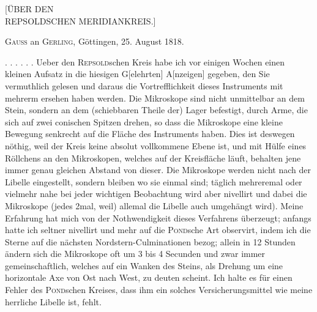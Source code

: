 \clearpage\begingroup
{}\NoSourceHead\HistoricalFoot{}{40\textsuperscript{*}}
\begin{center}
{\large [ÜBER DEN\\REPSOLDSCHEN MERIDIANKREIS.]}\par\medskip
{}\par\medskip
\textsc{Gauss} an \textsc{Gerling}, Göttingen, 25. August 1818.
\end{center}

\noindent\hspace*{\parindent}. . . . . . Ueber den \textsc{Repsold}schen Kreis habe ich vor einigen Wochen einen kleinen Aufsatz in die hiesigen G[elehrten] A[nzeigen\begingroup\renewcommand{\thefootnote}{*)}\footnotemark\renewcommand{\thefootnote}{[*)}\footnotetext{1818 S. 1257, Werke VI, S. 410.]}\endgroup] gegeben, den Sie vermuthlich gelesen und daraus die Vortrefflichkeit dieses Instruments mit mehrerm ersehen haben werden. Die Mikroskope sind nicht unmittelbar an dem Stein, sondern an dem (schiebbaren Theile der) Lager befestigt, durch Arme, die sich auf zwei conischen Spitzen drehen, so dass die Mikroskope eine kleine Bewegung senkrecht auf die Fläche des Instruments haben. Dies ist deswegen nöthig, weil der Kreis keine absolut vollkommene Ebene ist, und mit Hülfe eines Röllchens an den Mikroskopen, welches auf der Kreisfläche läuft, behalten jene immer genau gleichen Abstand von dieser. Die Mikroskope werden nicht nach der Libelle eingestellt, sondern bleiben wo sie einmal sind; täglich mehreremal oder vielmehr nahe bei jeder wichtigen Beobachtung wird aber nivellirt und dabei die Mikroskope  (jedes 2mal, weil) allemal die Libelle auch umgehängt wird). Meine Erfahrung hat mich von der Nothwendigkeit dieses Verfahrens überzeugt; anfangs hatte ich seltner nivellirt und mehr auf die \textsc{Pond}sche Art observirt, indem ich die Sterne auf die nächsten Nordstern-Culminationen bezog; allein in 12 Stunden ändern sich die Mikroskope oft um 3 bis 4 Secunden und zwar immer gemeinschaftlich, welches auf ein Wanken des Steins, als Drehung um eine horizontale Axe von Ost nach West, zu deuten scheint. Ich halte es für einen Fehler des \textsc{Pond}schen Kreises, dass ihm ein solches Versicherungsmittel wie meine herrliche Libelle ist, fehlt.

